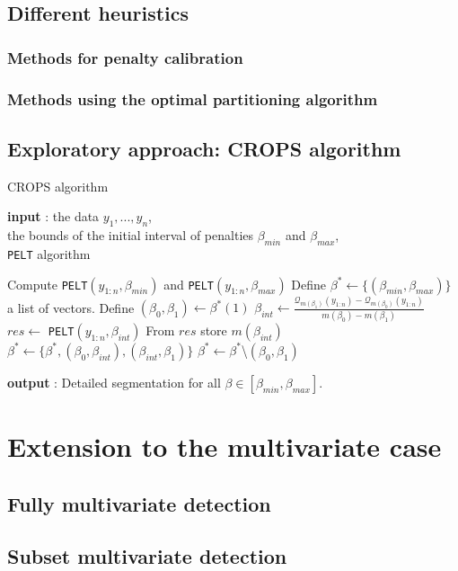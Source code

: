 \subsection{Different heuristics}

\subsubsection{Methods for penalty calibration}

\subsubsection{Methods using the optimal partitioning algorithm}

\subsection{Exploratory approach: CROPS algorithm}

\begin{algorithm}
\caption{CROPS algorithm}\label{chp2:algo:crops}
\begin{algorithmic}

\State \textbf{input} : the data $y_{1},...,y_{n}$, \\
the bounds of the initial interval of penalties $\beta_{min}$ and $\beta_{max}$, \\
\texttt{PELT} algorithm 
  
\State Compute \texttt{PELT}$(y_{1:n},\beta_{min})$ and \texttt{PELT}$(y_{1:n},\beta_{max})$ 
\State Define $\beta^* \gets \{(\beta_{min},\beta_{max})\}$ a list of vectors.  
\While{$\beta^*\neq \emptyset$}
  \State Define $(\beta_0, \beta_1) \gets \beta^*(1)$
    \State $\beta_{int} \gets \frac{\mathcal{Q}_{m(\beta_1)}(y_{1:n})-\mathcal{Q}_{m(\beta_0)}(y_{1:n})}{m(\beta_0)-m(\beta_1)}$
    \State $res \gets$ \texttt{PELT}$(y_{1:n},\beta_{int})$
    \State From $res$ store $m(\beta_{int})$
      \State $\beta^* \gets \{\beta^*,(\beta_0,\beta_{int}),(\beta_{int},\beta_1)\}$
    \EndIf
  \EndIf
  \State $\beta^* \gets \beta^*$\textbackslash$(\beta_0,\beta_1)$
\EndWhile 
   
\State \textbf{output} : Detailed segmentation for all $\beta \in [\beta_{min},\beta_{max}]$. 
 
\end{algorithmic}
\end{algorithm} 

\section{Extension to the multivariate case}

\subsection{Fully multivariate detection}

\subsection{Subset multivariate detection}


